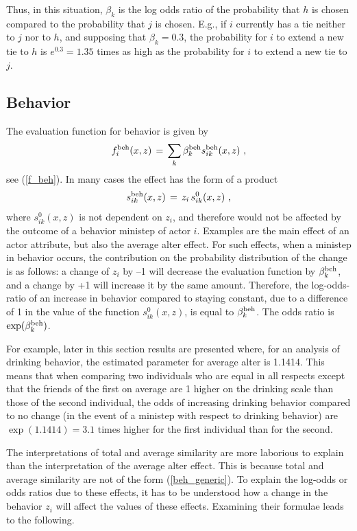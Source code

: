 \documentclass[a4paper,fleqn,11pt]{article}
\newcommand{\+}{\, + \,}
\begin{document}
Thus, in this situation, $\beta_k$ is the log odds ratio of the probability
that $h$ is chosen compared to the probability that $j$ is chosen.
E.g., if $i$ currently has a tie neither to $j$ nor to $h$,
and supposing that $\beta_k = 0.3$, the probability for $i$ to
extend a new tie to $h$ is $e^{0.3} = 1.35$ times as high
as the probability for $i$ to extend a new tie to $j$.

\subsection{Behavior}

The evaluation function for behavior is given by
\[
f^{\rm beh}_i(x, z) \, = \, \sum_k \beta^{\rm beh}_k s^{\rm beh}_{ik}(x, z) \ ,
\]
see (\ref{f_beh}).
In many cases the effect has the form of a product
\begin{equation}
s^{\rm beh}_{ik}(x, z) \,=\, z_i \,s^{0}_{ik}(x, z) \ ,  \label{beh_generic}
\end{equation}
where $s^{0}_{ik}(x, z)$ is not dependent on $z_i$, and therefore
would not be affected by the outcome of a behavior ministep of actor $i$.
Examples are the main effect of an actor attribute, but also the
average alter effect.
For such effects, when a ministep in behavior occurs, the contribution
on the probability distribution of the change is as follows:
a change of $z_i $ by --1 will decrease the evaluation function by
$\beta^{\rm beh}_k$, and a change by +1 will increase it by the same amount.
Therefore, the log-odds-ratio of an increase in behavior compared to
staying constant, due to a difference of 1 in the
value of the function $s^{0}_{ik}(x, z)$, is equal to
$\beta^{\rm beh}_k$. The odds ratio is $\exp(\beta^{\rm beh}_k)$.

For example, later in this section results are presented where,
for an analysis of drinking behavior, the
estimated parameter for average alter is 1.1414.
This means that when comparing two individuals who are equal in all respects
except that the friends of the first on average are  1 higher
on the drinking scale than those of the second individual,
the odds of increasing drinking behavior compared to no change
(in the event of a ministep with respect to drinking behavior)
are $\exp(1.1414) = 3.1$ times higher for the first individual
than for the second.

The interpretations of total and average similarity are more laborious
to explain than the interpretation of the average alter effect.
This is because total and average similarity are not of the form
(\ref{beh_generic}). To explain the log-odds or odds ratios due to these
effects, it has to be understood how a change in the behavior $z_i$
will affect the values of these effects.
Examining their formulae leads to the following.
\end{document}
